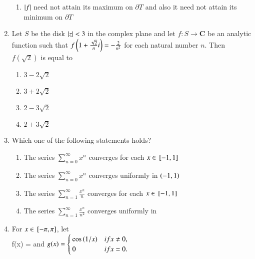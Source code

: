\documentclass[journal]{IEEEtran}
\numberwithin{equation}{enumi}
\numberwithin{figure}{enumi}
\begin{document}
\begin{enumerate}[start=18]
\begin{enumerate}
        \item $\left\vert f\right\vert$ need not attain its maximum on  $\partial T$ and also it need not attain its minimum on $\partial T$
    \end{enumerate}
    \item Let  $S$ be the disk  $\left\vert z\right\vert < 3$ in the complex plane and let $f : S \to \mathbf{C}$  be an analytic function such that
    $ f\left( 1 + \frac{\sqrt{2}}{n}i\right) = -\frac{2}{n^2}$ for each natural number $n$. Then $ f(\sqrt{2}) $ is equal to
    \begin{enumerate}
        \item $3 - 2\sqrt{2}$
        \item $3 + 2\sqrt{2}$
        \item $2 - 3\sqrt{2}$
        \item $2 + 3\sqrt{2}$
    \end{enumerate}
    \item Which one of the following statements holds?
    \begin{enumerate}
        \item The series $\sum_{n=0}^{\infty} x^n$ converges for each $x \in {}\left[-1,1\right] $
        \item The series $\sum_{n=0}^{\infty} x^n$ converges uniformly in $\left(-1, 1\right)$
        \item The series $\sum_{n=1}^{\infty} \frac{x^n}{n}$ converges for each $x \in {}\left[-1,1\right]$
        \item The series $\sum_{n=1}^{\infty} \frac{x^n}{n^2}$ converges uniformly in 
    \end{enumerate}
    \item For $x \in {}\left[-\pi, \pi\right]$, let
    \\
    f(x) =  and $g(x) = \begin{cases}
    \cos\left(1/x\right) & if x \neq 0, \\
    0 & if x = 0.
    \end{cases}$
   

\end{enumerate}
\end{document}
